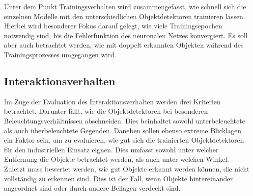 Unter dem Punkt Trainingsverhalten wird zusammengefasst, wie schnell sich die einzelnen Modelle mit den unterschiedlichen Objektdetektoren trainieren lassen. Hierbei wird besonderer Fokus darauf gelegt, wie viele Trainingsepochen notwendig sind, bis die Fehlerfunktion des neuronalen Netzes konvergiert. Es soll aber auch betrachtet werden, wie mit doppelt erkannten Objekten während des Trainingsprozesses umgegangen wird. 

\subsection*{Interaktionsverhalten}

Im Zuge der Evaluation des Interaktionsverhalten werden drei Kriterien betrachtet. Darunter fällt, wie die Objektdetektoren bei besonderen Beleuchtungsverhältnissen abschneiden. Dies beinhaltet sowohl unterbeleuchtete als auch überbeleuchtete Gegenden. Daneben sollen ebenso extreme Blicklagen ein Faktor sein, um zu evaluieren, wie gut sich die trainierten Objektdetektoren für den industriellen Einsatz eignen. Dies umfasst sowohl unter welcher Entfernung die Objekte betrachtet werden, als auch unter welchen Winkel. Zuletzt muss bewertet werden, wie gut Objekte erkannt werden können, die nicht vollständig zu erkennen sind. Dies ist der Fall, wenn Objekte hintereinander angeordnet sind oder durch andere Beilagen verdeckt sind. 
